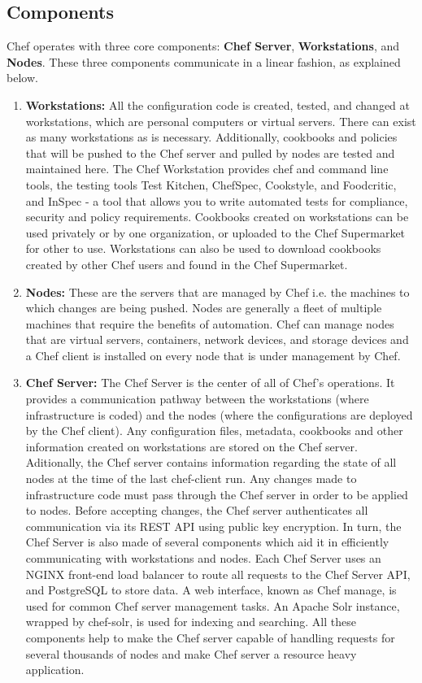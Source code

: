 \documentclass[a4paper, 12pt]{article}
\begin{document}
\subsection{Components}
Chef operates with three core components: \textbf{Chef Server}, \textbf{Workstations}, and \textbf{Nodes}. These three components communicate in a linear fashion, as explained below. 
\begin{enumerate}
\item
\textbf{Workstations:} All the configuration code is created, tested, and changed at workstations, which are personal computers or virtual servers. There can exist as many workstations as is necessary. Additionally, cookbooks and policies that will be pushed to the Chef server and pulled by nodes are tested and maintained here. The Chef Workstation provides chef and command line tools, the testing tools Test Kitchen, ChefSpec, Cookstyle, and Foodcritic, and InSpec - a tool that allows you to write automated tests for compliance, security and policy requirements. Cookbooks created on workstations can be used privately or by one organization, or uploaded to the Chef Supermarket for other to use. Workstations can also be used to download cookbooks created by other Chef users and found in the Chef Supermarket.
\item
\textbf{Nodes:} These are the servers that are managed by Chef i.e. the machines to which changes are being pushed. Nodes are generally a fleet of multiple machines that require the benefits of automation. Chef can manage nodes that are virtual servers, containers, network devices, and storage devices and a Chef client is installed on every node that is under management by Chef. 
\item
\textbf{Chef Server:} The Chef Server is the center of all of Chef's operations. It provides a communication pathway between the workstations (where infrastructure is coded) and the nodes (where the configurations are deployed by the Chef client). Any configuration files, metadata, cookbooks and other information created on workstations are stored on the Chef server. Aditionally, the Chef server contains information regarding the state of all nodes at the time of the last chef-client run. Any changes made to infrastructure code must pass through the Chef server in order to be applied to nodes. Before accepting changes, the Chef server authenticates all communication via its REST API using public key encryption. In turn, the Chef Server is also made of several components which aid it in efficiently communicating with workstations and nodes. Each Chef Server uses an NGINX front-end load balancer to route all requests to the Chef Server API, and PostgreSQL to store data. A web interface, known as Chef manage, is used for common Chef server management tasks. An Apache Solr instance, wrapped by chef-solr, is used for indexing and searching. All these components help to make the Chef server capable of handling requests for several thousands of nodes and make Chef server a resource heavy application.
\end{enumerate}
\end{document}
